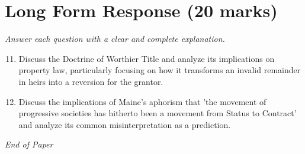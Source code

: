 \documentclass[12pt]{article}
\begin{document}
\section*{Long Form Response (20 marks)}
\textit{Answer each question with a clear and complete explanation.}
\begin{enumerate}[label=\arabic*.]
\setcounter{enumi}{10}
\item Discuss the Doctrine of Worthier Title and analyze its implications on property law, particularly focusing on how it transforms an invalid remainder in heirs into a reversion for the grantor.
\item Discuss the implications of Maine's aphorism that 'the movement of progressive societies has hitherto been a movement from Status to Contract' and analyze its common misinterpretation as a prediction.
\end{enumerate}

\vfill
\noindent\textit{End of Paper}
\end{document}
